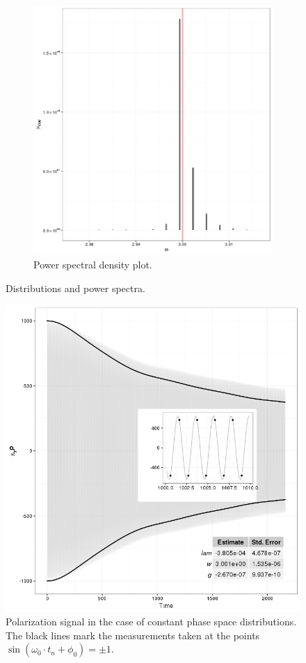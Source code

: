 \documentclass{article}
\begin{document}
\begin{figure}[h]
\begin{subfigure}[b]{.45\textwidth}
		\includegraphics[scale=.5]{../img/Spec_PhysDistros}
		\caption{Power spectral density plot.\label{fig:PSD_cDyPhys}}
	\end{subfigure}
	\caption{Distributions and power spectra.}
\end{figure}
\begin{figure}[h]
	\centering
	\includegraphics[scale=.6]{../img/Sgl_PhysDistros}
	\caption{Polarization signal in the case of constant phase space distributions. The black lines mark the measurements taken at the points $\sin(\omega_0\cdot t_n + \phi_0)=\pm 1$.\label{fig:Sgl_cDyPhys}}
\end{figure}
\end{document}
